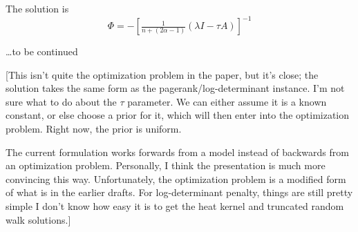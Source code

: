 \documentclass{article}
\begin{document}
The solution is
\[
    \Phi = - [\tfrac{1}{n + (2\alpha - 1)}(\lambda I - \tau A)]^{-1}
\]

\ldots to be continued

[This isn't quite the optimization problem in the paper, but it's close;
the solution takes the same form as the pagerank/log-determinant instance.
I'm not sure what to do about the $\tau$ parameter.  We can either assume
it is a known constant, or else choose a prior for it, which will then
enter into the optimization problem.  Right now, the prior is uniform.

The current formulation works forwards from a model instead of backwards
from an optimization problem.  Personally, I think the presentation is
much more convincing this way.  Unfortunately, the optimization problem
is a modified form of what is in the earlier drafts.  For log-determinant
penalty, things are still pretty simple  I don't know how easy it is to get
the heat kernel and truncated random walk solutions.]
\end{document}

